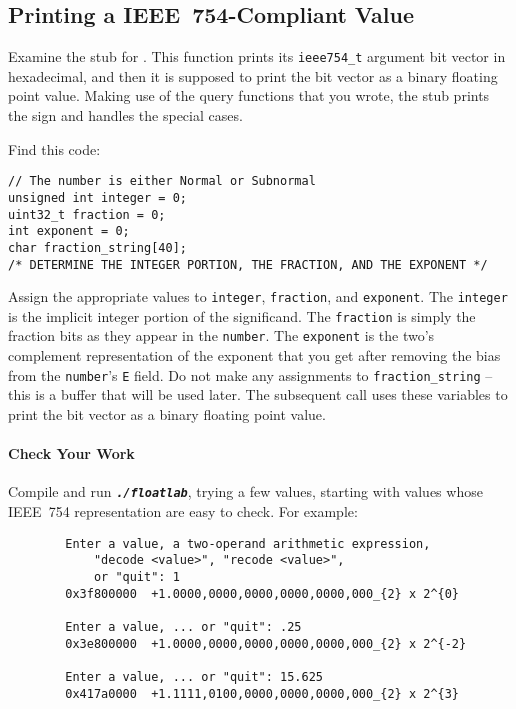 \subsection{Printing a IEEE~754-Compliant Value} \label{subsec:printing}

Examine the stub for .
This function prints its \lstinline{ieee754_t} argument bit vector in hexadecimal, and then it is supposed to print the bit vector as a binary floating point value.
Making use of the query functions that you wrote, the stub prints the sign and handles the special cases.

Find this code:

\begin{lstlisting}
// The number is either Normal or Subnormal
unsigned int integer = 0;
uint32_t fraction = 0;
int exponent = 0;
char fraction_string[40];
/* DETERMINE THE INTEGER PORTION, THE FRACTION, AND THE EXPONENT */
\end{lstlisting}

Assign the appropriate values to \lstinline{integer}, \lstinline{fraction}, and \lstinline{exponent}.
The \lstinline{integer} is the implicit integer portion of the significand.
The \lstinline{fraction} is simply the fraction bits as they appear in the \lstinline{number}.
The \lstinline{exponent} is the two's complement representation of the exponent that you get after removing the bias from the \lstinline{number}'s \texttt{E} field.
Do not make any assignments to \lstinline{fraction_string} -- this is a buffer that will be used later.
The subsequent  call uses these variables to print the bit vector as a binary floating point value.

\paragraph*{Check Your Work}

Compile and run \texttt{\textbf{\textit{./floatlab}}}, trying a few values, starting with values whose IEEE~754 representation are easy to check.
For example:

\begin{verbatim}
        Enter a value, a two-operand arithmetic expression,
            "decode <value>", "recode <value>",
            or "quit": 1
        0x3f800000	+1.0000,0000,0000,0000,0000,000_{2} x 2^{0}

        Enter a value, ... or "quit": .25
        0x3e800000	+1.0000,0000,0000,0000,0000,000_{2} x 2^{-2}

        Enter a value, ... or "quit": 15.625
        0x417a0000	+1.1111,0100,0000,0000,0000,000_{2} x 2^{3}
\end{verbatim}


